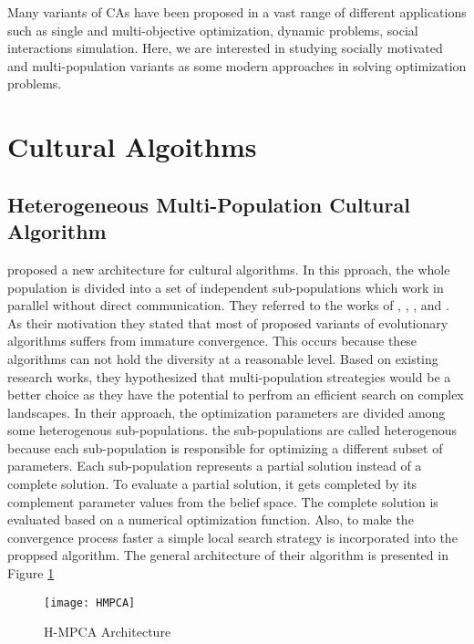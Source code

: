 \label{chapter:problem}

\newlength{\savedunitlength}
\setlength{\unitlength}{2em}

Many variants of CAs have been proposed in a vast range of different applications such as single and multi-objective optimization, dynamic problems, social interactions simulation. Here, we are interested in studying socially motivated and multi-population variants as some modern approaches in solving optimization problems.
\section{Cultural Algoithms}
\subsection{Heterogeneous Multi-Population Cultural Algorithm}
\citet{kobti2013heterogeneous} proposed a new architecture for cultural algorithms. In this pproach, the whole population is divided into a set of independent sub-populations which work in parallel without direct communication. They referred to the works of \citet{xu2010novel}, \citet{guo2011novel}, \citet{vasile2011inflationary}, and \citet{sharma2011reserve}. As their motivation they stated that most of proposed variants of evolutionary algorithms suffers from immature convergence. This occurs because these algorithms can not hold the diversity at a reasonable level. Based on existing research works, they hypothesized that multi-population streategies would be a better choice as they have the potential to perfrom an efficient search on complex landscapes. In their approach, the optimization parameters are divided among some heterogenous sub-populations. the sub-populations are called heterogenous because each sub-population is responsible for optimizing a different subset of parameters. Each sub-population represents a partial solution instead of a complete solution. To evaluate a partial solution, it gets completed by its complement parameter values from the belief space. The complete solution is evaluated based on a numerical optimization function. Also, to make the convergence process faster a simple local search strategy is incorporated into the proppsed algorithm. The general architecture of their algorithm is presented in Figure \ref{fig:HPMCA} \newline
\begin{figure}[h]
	\texttt{[image: HMPCA]}
	\centering
	\caption{H-MPCA Architecture \citet{kobti2013heterogeneous}}
	\label{fig:HPMCA}
\end{figure}
